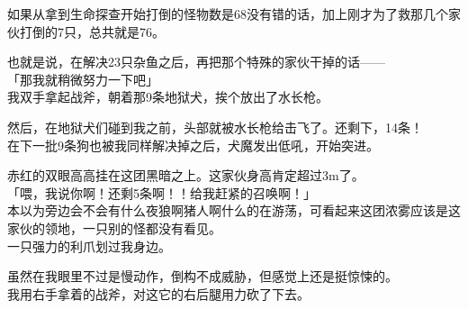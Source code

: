 如果从拿到生命探查开始打倒的怪物数是68没有错的话，加上刚才为了救那几个家伙打倒的7只，总共就是76。

也就是说，在解决23只杂鱼之后，再把那个特殊的家伙干掉的话——\\

「那我就稍微努力一下吧」\\

我双手拿起战斧，朝着那9条地狱犬，挨个放出了水长枪。

然后，在地狱犬们碰到我之前，头部就被水长枪给击飞了。还剩下，14条！\\

在下一批9条狗也被我同样解决掉之后，犬魔发出低吼，开始突进。

赤红的双眼高高挂在这团黑暗之上。这家伙身高肯定超过3m了。\\

「喂，我说你啊！还剩5条啊！！给我赶紧的召唤啊！」\\

本以为旁边会不会有什么夜狼啊猪人啊什么的在游荡，可看起来这团浓雾应该是这家伙的领地，一只别的怪都没有看见。\\

一只强力的利爪划过我身边。

虽然在我眼里不过是慢动作，倒构不成威胁，但感觉上还是挺惊悚的。\\

我用右手拿着的战斧，对这它的右后腿用力砍了下去。

